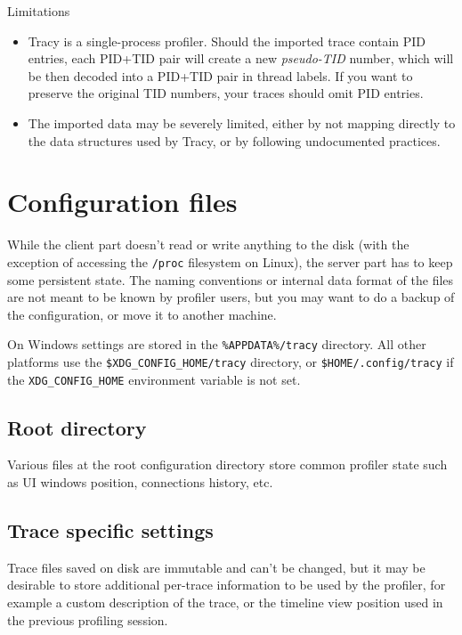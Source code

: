 \documentclass[hidelinks,titlepage,a4paper]{article}
\begin{document}
\begin{bclogo}[
noborder=true,
couleur=black!5,
logo=\bcattention
]{Limitations}
\begin{itemize}
\item Tracy is a single-process profiler. Should the imported trace contain PID entries, each PID+TID pair will create a new \emph{pseudo-TID} number, which will be then decoded into a PID+TID pair in thread labels. If you want to preserve the original TID numbers, your traces should omit PID entries.
\item The imported data may be severely limited, either by not mapping directly to the data structures used by Tracy, or by following undocumented practices.
\end{itemize}
\end{bclogo}

\section{Configuration files}
\label{configurationfiles}

While the client part doesn't read or write anything to the disk (with the exception of accessing the \texttt{/proc} filesystem on Linux), the server part has to keep some persistent state. The naming conventions or internal data format of the files are not meant to be known by profiler users, but you may want to do a backup of the configuration, or move it to another machine.

On Windows settings are stored in the \texttt{\%APPDATA\%/tracy} directory. All other platforms use the \texttt{\$XDG\_CONFIG\_HOME/tracy} directory, or \texttt{\$HOME/.config/tracy} if the \texttt{XDG\_CONFIG\_HOME} environment variable is not set.

\subsection{Root directory}

Various files at the root configuration directory store common profiler state such as UI windows position, connections history, etc.

\subsection{Trace specific settings}
\label{tracespecific}

Trace files saved on disk are immutable and can't be changed, but it may be desirable to store additional per-trace information to be used by the profiler, for example a custom description of the trace, or the timeline view position used in the previous profiling session.
\end{document}
